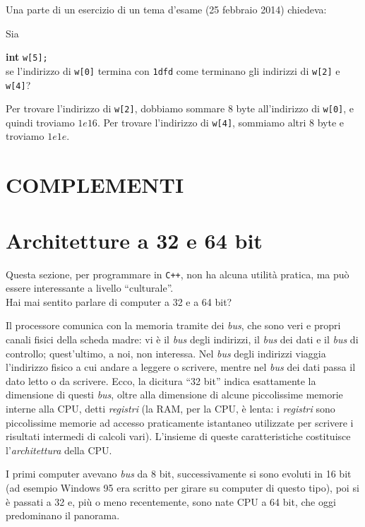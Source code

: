 	Una parte di un esercizio di un tema d'esame (25 febbraio 2014) chiedeva:
\begin{shaded}
Sia
 
\qquad\textbf{int} \verb|w[5];|\\
se l'indirizzo di \verb|w[0]| termina con \verb|1dfd| come terminano gli indirizzi 
di \verb|w[2]| e \verb|w[4]|?
\end{shaded}
Per trovare l'indirizzo di \verb|w[2]|, dobbiamo sommare 8 byte all'indirizzo di \verb|w[0]|, e quindi troviamo $1e16$. Per trovare l'indirizzo di \verb|w[4]|, sommiamo altri 8 byte e troviamo $1e1e$.
\begin{subappendices}
	\section*{COMPLEMENTI}
\section{Architetture a 32 e 64 bit}\label{archCPU}
Questa sezione, per programmare in \verb|C++|, non ha alcuna utilità  pratica, ma può essere interessante a livello ``culturale''.\\

Hai mai sentito parlare di computer a 32 e a 64 bit? 

Il processore comunica con la memoria tramite dei \emph{bus}, che sono veri e propri canali fisici della scheda madre: vi è il \emph{bus} degli indirizzi, il \emph{bus} dei dati e il \emph{bus} di controllo; quest'ultimo, a noi, non interessa. Nel \emph{bus} degli indirizzi viaggia l'indirizzo fisico a cui andare a leggere o scrivere, mentre nel \emph{bus} dei dati passa il dato letto o da scrivere. Ecco, la dicitura ``32 bit'' indica esattamente la dimensione di questi \emph{bus}, oltre alla dimensione di alcune piccolissime memorie interne alla CPU, detti \emph{registri} (la RAM, per la CPU, è lenta: i \emph{registri} sono piccolissime memorie ad accesso praticamente istantaneo utilizzate per scrivere i risultati intermedi di calcoli vari). L'insieme di queste caratteristiche costituisce l'\emph{architettura} della CPU. 

I primi computer avevano \emph{bus} da 8 bit, successivamente si sono evoluti in 16 bit (ad esempio Windows 95 era scritto per girare su computer di questo tipo), poi si è passati a 32 e, più o meno recentemente, sono nate CPU a 64 bit, che oggi predominano il panorama.


\end{subappendices}

